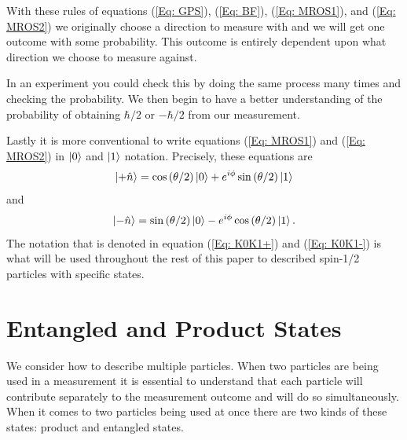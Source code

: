 \documentclass[twocolumn]{article}
\begin{document}
\par \noindent
With these rules of equations (\ref{Eq: GPS}), (\ref{Eq: BF}), (\ref{Eq: MROS1}), and (\ref{Eq: MROS2}) we originally choose a direction to measure with and we will get one outcome with some probability. This outcome is entirely dependent upon what direction we choose to measure against.

In an experiment you could check this by doing the same process many times and checking the probability. We then begin to have a better understanding of the probability of obtaining $\hbar/2$ or $-\hbar/2$ from our measurement.

Lastly it is more conventional to write equations (\ref{Eq: MROS1}) and (\ref{Eq: MROS2}) in $\ket{0}$ and $\ket{1}$ notation. Precisely, these equations are
\begin{equation} \label{Eq: K0K1+}
\ket{+\hat{n}}=\cos{(\theta/2)}\ket{0}+e^{i\phi}\sin{(\theta/2)}\ket{1}
\end{equation}
and
\begin{equation} \label{Eq: K0K1-}
\ket{-\hat{n}}=\sin{(\theta/2)}\ket{0}-e^{i\phi}\cos{(\theta/2)}\ket{1}.
\end{equation}
The notation that is denoted in equation (\ref{Eq: K0K1+}) and (\ref{Eq: K0K1-}) is what will be used throughout the rest of this paper to described spin-1/2 particles with specific states.
\section*{Entangled and Product States}
We consider how to describe multiple particles. When two particles are being used in a measurement it is essential to understand that each particle will contribute separately to the measurement outcome and will do so simultaneously. When it comes to two particles being used at once there are two kinds of these states: product and entangled states.
\end{document}

